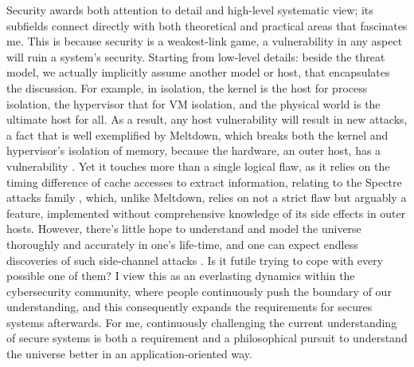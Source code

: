 \documentclass[10pt]{article}
\begin{document}
Security awards both attention to detail and high-level systematic view; its
subfields connect directly with both theoretical and practical areas that
fascinates me. This is because security is a weakest-link game, a
vulnerability in any aspect will ruin a system's security. Starting from
low-level details: beside the threat model, we actually implicitly assume
another model or host, that encapsulates the discussion. For
example, in isolation, the kernel is the host for process isolation, the
hypervisor that for VM isolation, and the physical world is the ultimate
host for all. As a result, any host vulnerability will result in new attacks,
a fact that is well exemplified by Meltdown, which breaks both the kernel and
hypervisor's isolation of memory, because the hardware, an outer host, has a
vulnerability \cite{meltdown}. Yet it touches more than a single logical flaw,
as it relies on the timing difference of cache accesses to extract information,
relating to the Spectre attacks family \cite{spectre}, which, unlike Meltdown,
relies on not a strict flaw but arguably a feature, implemented without
comprehensive knowledge of its side effects in outer hosts. 
However, there's little hope to understand and model the universe thoroughly
and accurately in one's life-time, and one can expect endless discoveries of
such side-channel attacks \cite{side.channel.1, side.channel.2,
side.channel.3}. Is it futile trying to cope with every possible one of them? I
view this as an everlasting dynamics within the cybersecurity community, where
people continuously push the boundary of our understanding, and this
consequently expands the requirements for secures systems afterwards. For me,
continuously challenging the current understanding of secure systems is both a
requirement and a philosophical pursuit to understand the universe better in an
application-oriented way.
\end{document}
